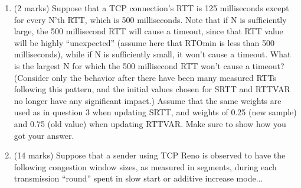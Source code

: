 \documentclass[10pt]{amsart}
\begin{document}
\begin{enumerate}
    \item (2 marks) Suppose that a TCP connection’s RTT is 125 milliseconds
        except for every N’th RTT, which is 500 milliseconds. Note that if N is
        sufficiently large, the 500 millisecond RTT will cause a timeout, since
        that RTT value will be highly “unexpected” (assume here that RTOmin is
        less than 500 milliseconds), while if N is sufficiently small, it won’t
        cause a timeout. What is the largest N for which the 500 millisecond RTT
        won’t cause a timeout? (Consider only the behavior after there have been
        many measured RTTs following this pattern, and the initial values chosen
        for SRTT and RTTVAR no longer have any significant impact.) Assume that
        the same weights are used as in question 3 when updating SRTT, and
        weights of 0.25 (new sample) and 0.75 (old value) when updating RTTVAR.
        Make sure to show how you got your answer.

    \item (14 marks) Suppose that a sender using TCP Reno is observed to have
        the following congestion window sizes, as measured in segments, during
        each transmission “round” spent in slow start or additive increase
        mode...


\end{enumerate}
\end{document}
